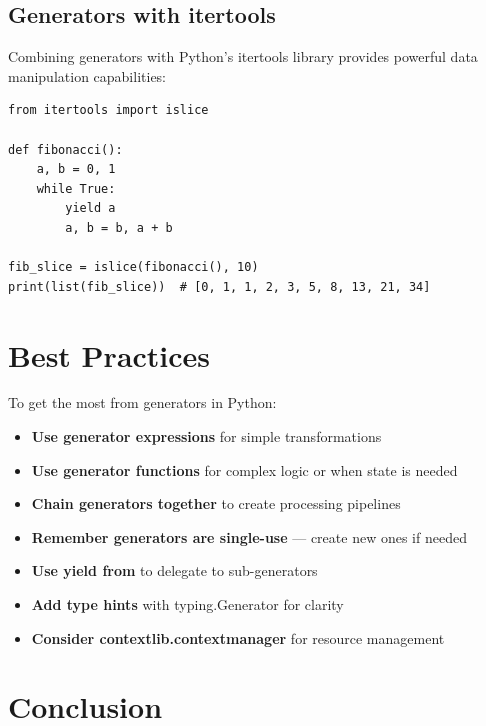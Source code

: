 \documentclass[12pt,letterpaper]{article}
\newenvironment{macterminal}{%
    \begin{mdframed}[
        linecolor=terminalFrame,
        backgroundcolor=terminalBg,
        roundcorner=5pt,
        skipabove=10pt,
        skipbelow=10pt,
        linewidth=1pt,
        innertopmargin=10pt, %
        frametitle={%
            \tikz[baseline=(current bounding box.east), outer sep=0pt]{
                \fill[red!80!black] (0,0) circle (5pt);
                \fill[yellow!80!black] (0.7,0) circle (5pt);
                \fill[green!70!black] (1.4,0) circle (5pt);
            }
        },
        frametitlealignment=\raggedright, %
        frametitleaboveskip=8pt, %
        frametitlebelowskip=0pt, %
    ]
}{%
    \end{mdframed}%
}
\begin{document}
\subsection{Generators with itertools}

Combining generators with Python's itertools library provides powerful data manipulation capabilities:

\begin{macterminal}
\begin{lstlisting}
from itertools import islice

def fibonacci():
    a, b = 0, 1
    while True:
        yield a
        a, b = b, a + b

fib_slice = islice(fibonacci(), 10)
print(list(fib_slice))  # [0, 1, 1, 2, 3, 5, 8, 13, 21, 34]
\end{lstlisting}
\end{macterminal}

\section{Best Practices}

To get the most from generators in Python:

\begin{itemize}
    \item \textbf{\textcolor{pythonBlue}{Use generator expressions}} for simple transformations
    \item \textbf{\textcolor{pythonBlue}{Use generator functions}} for complex logic or when state is needed
    \item \textbf{\textcolor{pythonBlue}{Chain generators together}} to create processing pipelines
    \item \textbf{\textcolor{pythonBlue}{Remember generators are single-use}} — create new ones if needed
    \item \textbf{\textcolor{pythonBlue}{Use yield from}} to delegate to sub-generators
    \item \textbf{\textcolor{pythonBlue}{Add type hints}} with typing.Generator for clarity
    \item \textbf{\textcolor{pythonBlue}{Consider contextlib.contextmanager}} for resource management
\end{itemize}

\section{Conclusion}
\end{document}
